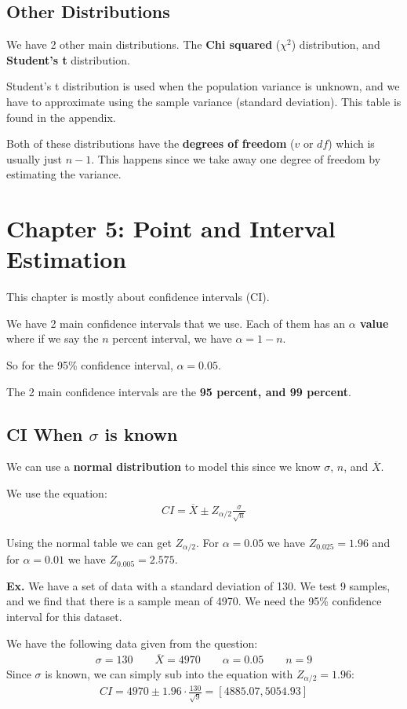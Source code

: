 \documentclass[12pt,letterpaper]{article} \usepackage{amsmath} \usepackage{graphicx} \usepackage[margin=1in]{geometry} \usepackage{longtable}  \usepackage{amssymb}
\begin{document}
	\subsection{Other Distributions}
	We have 2 other main distributions. The \textbf{Chi squared} ($\chi^2$) distribution, and \textbf{Student's t} distribution. 
	
	Student's t distribution is used when the population variance is unknown, and we have to approximate using the sample variance (standard deviation). This table is found in the appendix.
	
	Both of these distributions have the \textbf{degrees of freedom} ($v$ or $df$) which is usually just $n-1$. This happens since we take away one degree of freedom by estimating the variance. 
	
	\section{Chapter 5: Point and Interval Estimation} 
	This chapter is mostly about confidence intervals (CI). 
	
	We have 2 main confidence intervals that we use. Each of them has an \textbf{$\alpha$ value} where if we say the $n$ percent interval, we have $\alpha = 1-n$.
	
	So for the 95\% confidence interval, $\alpha = 0.05$. 
	
	The 2 main confidence intervals are the \textbf{95 percent, and 99 percent}. 
	
	\subsection{CI When $\sigma$ is known}
	We can use a \textbf{normal distribution} to model this since we know $\sigma$, $n$, and $\overline X$. 
	
	We use the equation:
	\begin{align*}
		CI = \overline X \pm Z_{\alpha/2} \frac{\sigma}{\sqrt n}
	\end{align*}

	Using the normal table we can get $Z_{\alpha/2}$. For $\alpha = 0.05$ we have $Z_{0.025} = 1.96$ and for $\alpha = 0.01$ we have $Z_{0.005} = 2.575$.
	
	\begin{mdframed}
		\textbf{Ex. }We have a set of data with a standard deviation of 130. We test 9 samples, and we find that there is a sample mean of 4970. We need the 95\% confidence interval for this dataset. 
		
		We have the following data given from the question:
		\begin{align*}
			\sigma = 130 \qquad \overline X = 4970 \qquad \alpha = 0.05 \qquad n = 9
		\end{align*}
		Since $\sigma$ is known, we can simply sub into the equation with $Z_{\alpha/2}=1.96$:
		\begin{align*}
			CI = 4970\pm1.96\cdot\frac{130}{\sqrt9}=[4885.07,5054.93]
		\end{align*}
	\end{mdframed}
	
\end{document}
